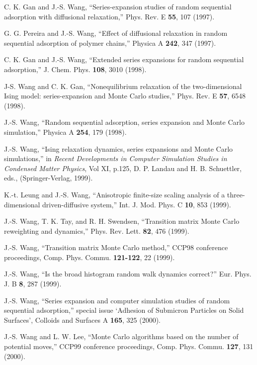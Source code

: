\itm C. K. Gan and J.-S. Wang, ``Series-expansion studies of 
  random sequential adsorption with diffusional relaxation,''
  Phys. Rev. E {\bf 55}, 107 (1997).

\itm G. G. Pereira and J.-S. Wang, ``Effect of diffusional
  relaxation in random sequential adsorption of polymer chains,'' 
  Physica A {\bf 242}, 347 (1997).

\itm C. K. Gan and J.-S. Wang, ``Extended series expansions for
  random sequential adsorption,'' 
  J. Chem. Phys. {\bf 108}, 3010 (1998).

\itm J-S. Wang and C. K. Gan, 
  ``Nonequilibrium relaxation of the two-dimensional Ising model:
  series-expansion and Monte Carlo studies,'' 
  Phys. Rev. E {\bf 57}, 6548 (1998). 

\itm J.-S. Wang, ``Random sequential adsorption, series expansion
  and Monte Carlo simulation,'' Physica A {\bf 254}, 179 (1998).

\itm  J.-S. Wang, ``Ising relaxation dynamics, series expansions and 
  Monte Carlo simulations,'' in {\it Recent Developments in Computer 
  Simulation Studies in Condensed Matter Physics}, Vol XI, p.125, D. P. Landau 
  and H. B. Schuettler, eds., (Springer-Verlag, 1999).   

\itm K.-t. Leung and J.-S. Wang, ``Anisotropic finite-size scaling analysis 
  of a three-dimensional driven-diffusive system,'' 
  Int. J. Mod. Phys. C {\bf 10}, 853 (1999).

\itm  J.-S. Wang, T. K. Tay, and R. H. Swendsen, ``Transition matrix
  Monte Carlo reweighting and dynamics,''  
  Phys. Rev. Lett. {\bf 82}, 476 (1999).


\itm J.-S. Wang, ``Transition matrix Monte Carlo method,'' 
  CCP98 conference proceedings, Comp. Phys.  Commu. {\bf 121-122}, 22 (1999). 

\itm J.-S. Wang, ``Is the broad histogram random walk dynamics correct?''
  Eur. Phys. J. B {\bf 8}, 287 (1999). 

\itm J.-S. Wang, ``Series expansion and computer simulation studies of random
 sequential adsorption,'' special issue `Adhesion 
  of Submicron Particles on Solid Surfaces', 
  Colloids and Surfaces A {\bf 165}, 325 (2000). 

\itm J.-S. Wang and L. W. Lee, ``Monte Carlo algorithms based on the
 number of potential moves,'' CCP99 conference proceedings,
  Comp. Phys. Commu. {\bf 127}, 131 (2000). 


